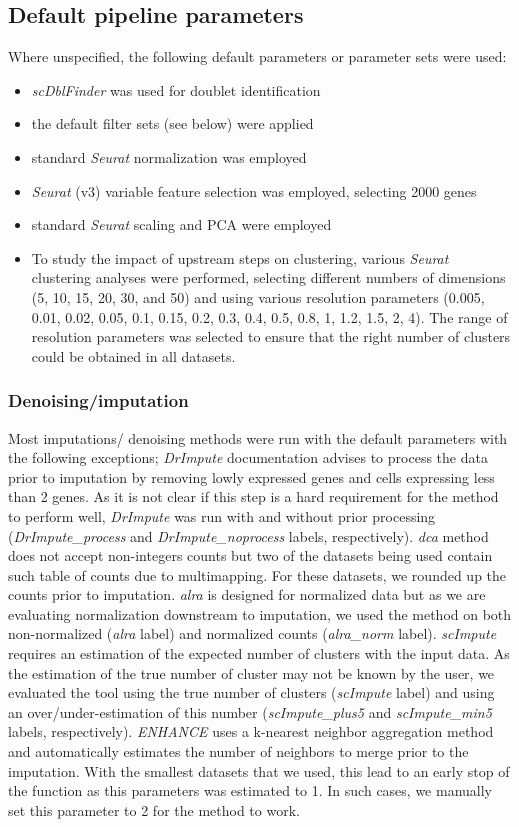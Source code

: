 \documentclass{bmcart}
\begin{document}
\subsection*{Default pipeline parameters}

Where unspecified, the following default parameters or parameter sets were used:
\begin{itemize}
    \item \textit{scDblFinder} was used for doublet identification
    \item the default filter sets (see below) were applied
    \item standard \textit{Seurat} normalization was employed
    \item \textit{Seurat} (v3) variable feature selection was employed, selecting 2000 genes
    \item standard \textit{Seurat} scaling and PCA were employed
    \item To study the impact of upstream steps on clustering, various \textit{Seurat} clustering analyses were performed, selecting different numbers of dimensions (5, 10, 15, 20, 30, and 50) and using various resolution parameters (0.005, 0.01, 0.02, 0.05, 0.1, 0.15, 0.2, 0.3, 0.4, 0.5, 0.8, 1, 1.2, 1.5, 2, 4). The range of resolution parameters was selected to ensure that the right number of clusters could be obtained in all datasets.
\end{itemize}

\subsubsection{Denoising/imputation}
Most imputations/ denoising methods were run with the default parameters with the following exceptions; \textit{DrImpute} documentation advises to process the data prior to imputation by removing lowly expressed genes and cells expressing less than 2 genes. As it is not clear if this step is a hard requirement for the method to perform well, \textit{DrImpute} was run with and without prior processing (\textit{DrImpute\_process} and \textit{DrImpute\_noprocess} labels, respectively). \textit{dca} method does not accept non-integers counts but two of the datasets being used contain such table of counts due to multimapping. For these datasets, we rounded up the counts prior to imputation. \textit{alra} is designed for normalized data but as we are evaluating normalization downstream to imputation, we used the method on both non-normalized (\textit{alra} label) and normalized counts (\textit{alra\_norm} label). \textit{scImpute} requires an estimation of the expected number of clusters with the input data. As the estimation of the true number of cluster may not be known by the user, we evaluated the tool using the true number of clusters (\textit{scImpute} label) and using an over/under-estimation of this number (\textit{scImpute\_plus5} and \textit{scImpute\_min5} labels, respectively). \textit{ENHANCE} uses a k-nearest neighbor aggregation method and automatically estimates the number of neighbors to merge prior to the imputation. With the smallest datasets that we used, this lead to an early stop of the function as this parameters was estimated to 1. In such cases, we manually set this parameter to 2 for the method to work. 
\end{document}
